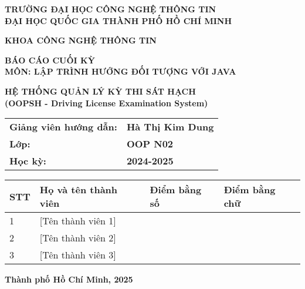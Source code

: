 \documentclass[12pt,a4paper]{article}
\begin{document}
\newpage
\begin{titlepage}
    \centering
    \vspace*{2cm}
    
    {\Large\bfseries TRƯỜNG ĐẠI HỌC CÔNG NGHỆ THÔNG TIN}\\
    \vspace{0.5cm}
    {\Large\bfseries ĐẠI HỌC QUỐC GIA THÀNH PHỐ HỒ CHÍ MINH}\\
    
    \vspace{2cm}
    
    {\Large\bfseries KHOA CÔNG NGHỆ THÔNG TIN}\\
    
    \vspace{3cm}
    
    {\Huge\bfseries BÁO CÁO CUỐI KỲ}\\
    \vspace{0.5cm}
    {\Large\bfseries MÔN: LẬP TRÌNH HƯỚNG ĐỐI TƯỢNG VỚI JAVA}\\
    
    \vspace{2cm}
    
    {\Huge\bfseries HỆ THỐNG QUẢN LÝ KỲ THI SÁT HẠCH}\\
    {\Large\bfseries (OOPSH - Driving License Examination System)}\\
    
    \vspace{3cm}
    
    \begin{tabular}{ll}
        \textbf{Giảng viên hướng dẫn:} & \textbf{Hà Thị Kim Dung} \\
        \textbf{Lớp:} & \textbf{OOP N02} \\
        \textbf{Học kỳ:} & \textbf{2024-2025} \\
    \end{tabular}
    
    \vspace{2cm}
    
    \begin{table}[h]
    \centering
    \begin{tabular}{|l|l|l|l|}
    \hline
    \textbf{STT} & \textbf{Họ và tên thành viên} & \textbf{Điểm bằng số} & \textbf{Điểm bằng chữ} \\
    \hline
    1 & [Tên thành viên 1] & & \\
    \hline
    2 & [Tên thành viên 2] & & \\
    \hline
    3 & [Tên thành viên 3] & & \\
    \hline
    \end{tabular}
    \end{table}
    
    \vspace{2cm}
    
    {\Large\bfseries Thành phố Hồ Chí Minh, 2025}
    
\end{titlepage}
\end{document}

